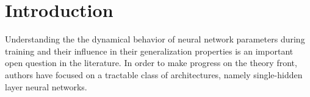 \section{Introduction}






Understanding the the dynamical behavior of neural network parameters during training and their influence in their generalization properties is an important open question in the literature. In order to make progress on the theory front, authors have focused on a tractable class of architectures, namely single-hidden layer neural networks. 



